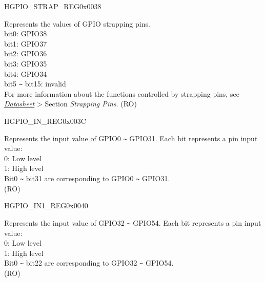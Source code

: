 \begin{register}{H}{GPIO\_STRAP\_REG}{0x0038}\label{regdesc:GPIOSTRAPREG}
%
%
\regnewline%
\begin{regdesc}\begin{reglist}
\label{fielddesc:GPIOSTRAPPING}\item [GPIO\_STRAPPING] Represents the values of GPIO strapping pins. \\
bit0: GPIO38\\
bit1: GPIO37\\
bit2: GPIO36\\
bit3: GPIO35\\
bit4: GPIO34\\
bit5 \verb+~+ bit15: invalid\\
For more information about the functions controlled by strapping pins, see \textit{\href{https://www.espressif.com/sites/default/files/documentation/esp32-p4_datasheet_en.pdf}{\chipname{} Datasheet}} > Section \textit{Strapping Pins}.
(RO)
\end{reglist}\end{regdesc}
\end{register}


\begin{register}{H}{GPIO\_IN\_REG}{0x003C}\label{regdesc:GPIOINREG}
%
\regnewline%
\begin{regdesc}\begin{reglist}
\label{fielddesc:GPIOINDATANEXT}\item [GPIO\_IN\_DATA\_NEXT] Represents the input value of GPIO0 \verb+~+ GPIO31. Each bit represents a pin input value:\\
0: Low level\\
1: High level\\
Bit0 \verb+~+ bit31 are corresponding to GPIO0 \verb+~+ GPIO31. \\
(RO)
\end{reglist}\end{regdesc}
\end{register}


\begin{register}{H}{GPIO\_IN1\_REG}{0x0040}\label{regdesc:GPIOIN1REG}
%
%
\regnewline%
\begin{regdesc}\begin{reglist}
\label{fielddesc:GPIOIN1DATANEXT}\item [GPIO\_IN1\_DATA\_NEXT] Represents the input value of GPIO32 \verb+~+ GPIO54. Each bit represents a pin input value:\\
0: Low level\\
1: High level\\
Bit0 \verb+~+ bit22 are corresponding to GPIO32 \verb+~+ GPIO54. \\
(RO)
\end{reglist}\end{regdesc}
\end{register}


